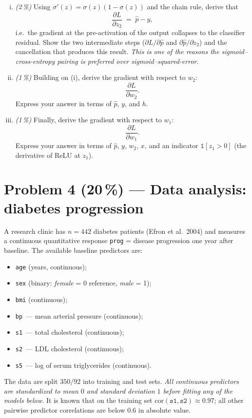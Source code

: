 \documentclass[11pt,a4paper]{article}
\newcommand{\points}[1]{\textbf{(#1\,\%)}}
\newcommand{\subpoints}[1]{\textit{(#1\,\%)}}
\begin{document}
\begin{enumerate}[(i)]
  \item \subpoints{2} Using $\sigma'(z) = \sigma(z)(1 - \sigma(z))$ and the chain rule, derive that
  $$\frac{\partial L}{\partial z_2} \;=\; \hat p - y,$$
  i.e.\ the gradient at the pre-activation of the output collapses to the classifier residual. Show the two intermediate steps ($\partial L / \partial \hat p$ and $\partial \hat p / \partial z_2$) and the cancellation that produces this result. \emph{This is one of the reasons the sigmoid--cross-entropy pairing is preferred over sigmoid--squared-error.}
  \item \subpoints{1} Building on (i), derive the gradient with respect to $w_2$:
  $$\frac{\partial L}{\partial w_2}.$$
  Express your answer in terms of $\hat p$, $y$, and $h$.
  \item \subpoints{1} Finally, derive the gradient with respect to $w_1$:
  $$\frac{\partial L}{\partial w_1}.$$
  Express your answer in terms of $\hat p$, $y$, $w_2$, $x$, and an indicator $\mathbb{1}[z_1 > 0]$ (the derivative of ReLU at $z_1$).
\end{enumerate}

\vfill\eject

\section*{Problem 4 \points{20} --- Data analysis: diabetes progression}

A research clinic has $n = 442$ diabetes patients (Efron et al.\ 2004) and measures a continuous quantitative response \texttt{prog} = disease progression one year after baseline. The available baseline predictors are:
\begin{itemize}
  \item \texttt{age} (years, continuous);
  \item \texttt{sex} (binary: \emph{female} = 0 reference, \emph{male} = 1);
  \item \texttt{bmi} (continuous);
  \item \texttt{bp}\ --- mean arterial pressure (continuous);
  \item \texttt{s1}\ --- total cholesterol (continuous);
  \item \texttt{s2}\ --- LDL cholesterol (continuous);
  \item \texttt{s5}\ --- log of serum triglycerides (continuous).
\end{itemize}
The data are split $350 / 92$ into training and test sets. \emph{All continuous predictors are standardized to mean $0$ and standard deviation $1$ before fitting any of the models below.} It is known that on the training set $\mathrm{cor}(\texttt{s1}, \texttt{s2}) \approx 0.97$; all other pairwise predictor correlations are below $0.6$ in absolute value.
\end{document}

